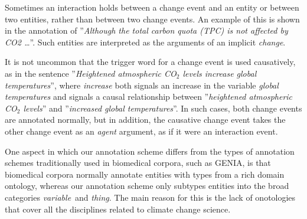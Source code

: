 Sometimes an interaction holds between a change event and an entity or between two entities, rather than between two change events. An example of this is shown in the annotation of ''\emph{Although the total carbon quota (TPC) is not affected by CO2 \dots}''. Such entities are interpreted as the arguments of an implicit \emph{change}. 

It is not uncommon that the trigger word for a change event is used causatively, as in the sentence ''\emph{Heightened atmospheric CO$_2$ levels increase global temperatures}'', where \emph{increase} both signals an increase in the variable \emph{global temperatures} and signals a causal relationship between ''\emph{heightened atmospheric CO$_2$ levels}'' and ''\emph{increased global temperatures}''. In such cases, both change events are annotated normally, but in addition, the causative change event takes the other change event as an \emph{agent} argument, as if it were an interaction event.

One aspect in which our annotation scheme differs from the types of annotation schemes  traditionally used in biomedical corpora, such as GENIA\citep{kim08}, is that biomedical corpora normally annotate entities with types from a rich domain ontology, whereas our annotation scheme only subtypes entities into the broad categories \emph{variable} and \emph{thing}. The main reason for this is the lack of onotologies that cover all the disciplines related to climate change science.
